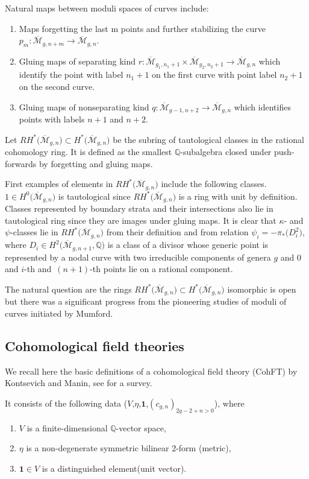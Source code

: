 \documentclass[pdftex]{sigma}
\def\oM{\overline{\mathcal{M}}}
\def\b1{{\mathbf 1}}
\numberwithin{equation}{section}
\begin{document}
Natural maps between moduli spaces of curves include:
\begin{enumerate}\itemsep=0pt
\item[(i)] Maps forgetting the last m points and further stabilizing the curve
$
p_m \colon \oM_{g, n+m} \to \oM_{g,n}$.
\item[(ii)] Gluing maps of separating kind
$
r\colon \oM_{g_1, n_1+1} \times \oM_{g_2, n_2+1} \to \oM_{g,n}$
which identify the point with label $n_1+1$ on the first curve with point label $n_2+1$ on the second curve.

\item[(iii)] Gluing maps of nonseparating kind
$
q \colon \oM_{g-1, n+2} \to \oM_{g,n}$
which identifies points with labels $n+1$ and $n+2$.
\end{enumerate}

Let
$
RH^*\big(\oM_{g,n}\big) \subset H^*\big(\oM_{g,n}\big)
$
be the subring of tautological
classes in the rational cohomology ring. It is defined as the smallest $\mathbb{Q}$-subalgebra closed under push-forwards by forgetting and gluing maps.

First examples of elements in $RH^*\big(\oM_{g,n}\big)$ include the following classes.
$1\in H^{0}\big(\oM_{g,n}\big)$ is tautological since $RH^*\big(\oM_{g,n}\big)$ is a ring with unit by definition. Classes represented by boundary strata and their intersections also lie in tautological ring since they are images under gluing maps.
It is clear that $\kappa$- and $\psi$-classes lie in $RH^*\big(\oM_{g,n}\big)$ from their definition and from relation $\psi_i = - \pi_{*}\big(D^{2}_{i}\big)$, where $D_i \in H^{2}\big(\oM_{g,n+1},\mathbb{Q}\big)$ is a class of a divisor whose generic point is represented by a nodal curve with two irreducible components of genera $g$ and $0$ and
$i$-th and~$(n+1)$-th points lie on a rational component.

The natural question are the rings $RH^*\big(\oM_{g,n}\big) \subset H^*\big(\oM_{g,n}\big)$ isomorphic is open but there was a significant progress from the pioneering studies of moduli of curves initiated by Mumford.

\subsection{Cohomological field theories} \label{cft}
We recall here the basic definitions of a cohomological field theory (CohFT) by Kontsevich and Manin, see \cite{PPP} for a survey.

It consists of the following data ($V$,$\eta$,$\b1$,$(c_{g,n})_{2g-2+n>0}$), where
\begin{enumerate}\itemsep=0pt
\item[(i)] $V$ is a finite-dimensional $\mathbb{Q}$-vector space,
\item[(ii)]$\eta$ is a non-degenerate symmetric bilinear 2-form (metric),
\item[(iii)]$\b1\in V$ is a distinguished element(unit vector).
\end{enumerate}
\end{document}
